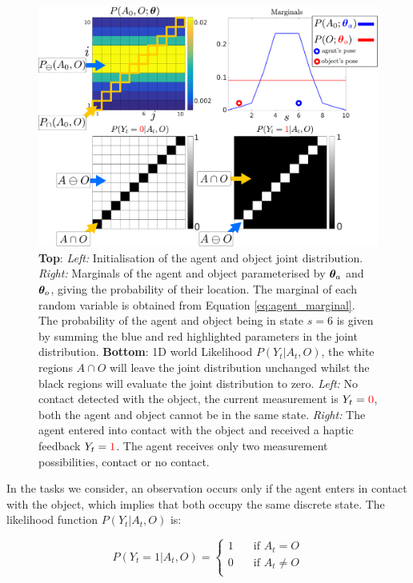 \begin{figure}
 \centering
 \includegraphics[width=\linewidth]{./ch5-MLMF/Figures/explenation/Figure4.pdf}
 \caption{\textbf{Top}: \textit{Left:} Initialisation of the agent and object joint distribution. 
 \textit{Right:} Marginals of the agent and object parameterised by $\boldsymbol{\theta}_a$ and $\boldsymbol{\theta}_o$, giving the probability of their location. The marginal of each 
 random variable is obtained from Equation \ref{eq:agent_marginal}. The probability of
 the agent and object being in state $s=6$ is given by summing the blue and red highlighted parameters in the joint distribution. 
 \textbf{Bottom}: 1D world Likelihood $P(Y_t|A_t,O)$, the white regions $A \cap O$ will leave the joint distribution unchanged whilst
 the black regions will evaluate the joint distribution to zero. \textit{Left:} No contact detected with the object, the current measurement 
 is $Y_t = \textcolor{red}0$, both the agent and object cannot be in the same state. \textit{Right:} The agent 
 entered into contact with the object and received a haptic feedback $Y_t = \textcolor{red}1$. The agent receives 
 only two measurement possibilities, contact or no contact.
 }
 \label{fig:histogram_joint}
\end{figure}

In the tasks we consider, an observation occurs only if the agent enters in contact with the object, which implies that both
occupy the same discrete state. The likelihood function $P(Y_t|A_t,O)$ is:

\begin{equation} \label{eq:discrete_likelihoood}
P(Y_t=1|A_t,O) =
  \begin{cases}
    1       & \quad \text{if } A_t = O     \\
    0  	    & \quad \text{if } A_t \not= O \\
  \end{cases}
\end{equation}

